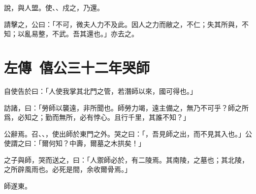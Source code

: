 說，與人盟。使、、戍之，乃還。

請擊之，公曰：「不可，微夫人力不及此。因人之力而敝之，不仁；失其所與，不知；以亂易整，不武。吾其還也。」亦去之。

\section[蹇叔哭師\quad{\small 左傳\ 僖公三十二年}]{{\normalsize 左傳\ 僖公三十二年}\quad {}哭師}
自使告於曰：「人使我掌其北門之管，若潛師以來，國可得也。」

訪諸，曰：「勞師以襲遠，非所聞也。師勞力竭，遠主備之，無乃不可乎？師之所爲，必知之；勤而無所，必有悖心。且行千里，其誰不知？」

公辭焉。召、、，使出師於東門之外。哭之曰：「，吾見師之出，而不見其入也。」公使謂之曰：「爾何知？中壽，爾墓之木拱矣！」

之子與師，哭而送之，曰：「人禦師必於，有二陵焉。其南陵，之墓也；其北陵，之所辟風雨也。必死是間，余收爾骨焉。」

師遂東。

